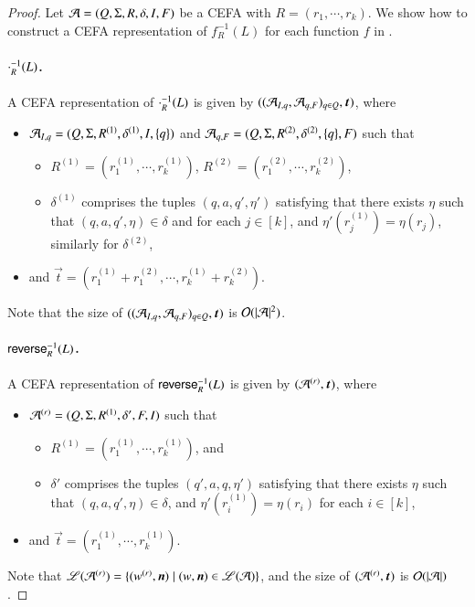\begin{proof}
	Let $\mathcal{A}=(Q, \Sigma, R, \delta, I, F)$ be a CEFA with $R= (r_1, \cdots, r_k)$. We show how to construct a CEFA representation of $f^{-1}_R(L)$ for each function $f$ in {\slint}.
	
	\paragraph*{$\cdot^{-1}_R(L)$.}
	A CEFA representation of $\cdot^{-1}_R(L)$ is given by $((\CEFA_{I, q}, \NFA_{q, F})_{q \in Q}, \vec{t})$, where 
	\begin{itemize}
		\item $\mathcal{A}_{I, q}=(Q, \Sigma, R^{(1)}, \delta^{(1)}, I, \{q\})$ and  $\mathcal{A}_{q, F}=(Q, \Sigma, R^{(2)}, \delta^{(2)}, \{q\}, F)$ such that 
		\begin{itemize}
			\item $R^{(1)} = (r^{(1)}_1, \cdots, r^{(1)}_k)$, $R^{(2)} = (r^{(2)}_1, \cdots, r^{(2)}_k)$, 
			\item $\delta^{(1)}$ comprises the tuples $(q, a, q', \eta')$ satisfying that there exists $\eta$ such that $(q, a, q', \eta) \in \delta$ and for each $j \in [k]$, and $\eta'(r^{(1)}_j)=\eta(r_j)$,  similarly for $\delta^{(2)}$,
		\end{itemize}
		\item and $\vec{t} = (r^{(1)}_1 + r^{(2)}_1, \cdots, r^{(1)}_k + r^{(2)}_k)$.
	\end{itemize}
	Note that the size of $((\CEFA_{I, q}, \NFA_{q, F})_{q \in Q}, \vec{t})$ is $\mathcal{O}(|\mathcal{A}|^2)$.
	\paragraph*{$\mathsf{reverse}^{-1}_R(L)$.} 
	A CEFA representation of $\mathsf{reverse}^{-1}_R(L)$ is given by $(\CEFA^{(r)}, \vec{t})$, where 
	\begin{itemize}
		\item $\mathcal{A}^{(r)}=(Q, \Sigma, R^{(1)}, \delta', F, I)$ such that 
		\begin{itemize}
			\item $R^{(1)}=(r^{(1)}_1,\cdots,r^{(1)}_k)$, and 
			\item $\delta'$ comprises the tuples $(q', a, q, \eta')$ satisfying that there exists $\eta$ such that $(q, a, q', \eta) \in \delta$, and $\eta'(r^{(1)}_i) = \eta(r_i)$ for each $i \in [k]$,
		\end{itemize}
		\item and $\vec{t}=(r^{(1)}_1, \cdots, r^{(1)}_k)$. 
	\end{itemize}
	Note that $\Lang(\CEFA^{(r)}) = \{(w^{(r)}, \vec{n}) \mid (w, \vec{n}) \in \Lang(\CEFA)\}$, and the size of $(\CEFA^{(r)}, \vec{t})$ is $\mathcal{O}(|\mathcal{A}|)$.
	

\end{proof}
